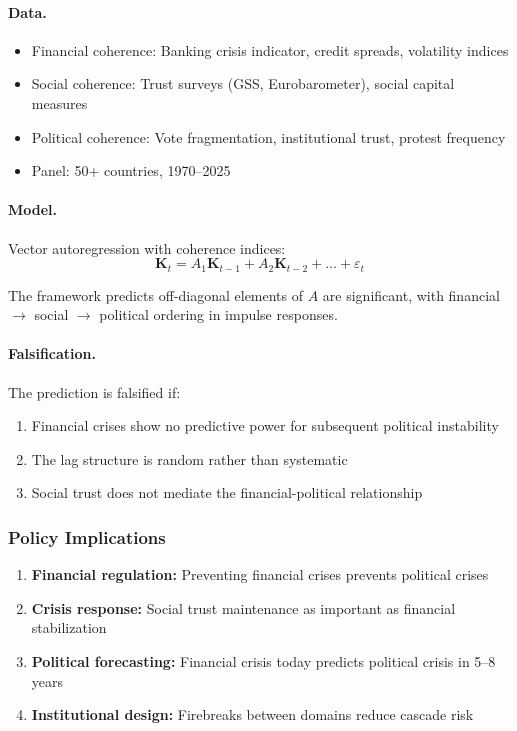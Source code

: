 \paragraph{Data.}
\begin{itemize}
  \item Financial coherence: Banking crisis indicator, credit spreads, volatility indices
  \item Social coherence: Trust surveys (GSS, Eurobarometer), social capital measures
  \item Political coherence: Vote fragmentation, institutional trust, protest frequency
  \item Panel: 50+ countries, 1970--2025
\end{itemize}

\paragraph{Model.}
Vector autoregression with coherence indices:
\begin{equation}
\mathbf{K}_t = A_1 \mathbf{K}_{t-1} + A_2 \mathbf{K}_{t-2} + \ldots + \varepsilon_t
\end{equation}

The framework predicts off-diagonal elements of $A$ are significant, 
with financial $\to$ social $\to$ political ordering in impulse responses.

\paragraph{Falsification.}
The prediction is falsified if:
\begin{enumerate}
  \item Financial crises show no predictive power for subsequent political instability
  \item The lag structure is random rather than systematic
  \item Social trust does not mediate the financial-political relationship
\end{enumerate}

\subsubsection{Policy Implications}

\begin{enumerate}
  \item \textbf{Financial regulation:} Preventing financial crises prevents political crises
  \item \textbf{Crisis response:} Social trust maintenance as important as financial stabilization
  \item \textbf{Political forecasting:} Financial crisis today predicts political crisis in 5--8 years
  \item \textbf{Institutional design:} Firebreaks between domains reduce cascade risk
\end{enumerate}

